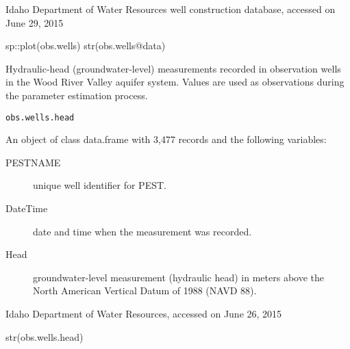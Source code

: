 \documentclass[a4paper]{book}
\begin{document}
%
\begin{Source}\relax
Idaho Department of Water Resources well construction database,
accessed on June 29, 2015
\end{Source}
%
\begin{SeeAlso}\relax
{}
\end{SeeAlso}
%
\begin{Examples}
\begin{ExampleCode}
sp::plot(obs.wells)
str(obs.wells@data)

\end{ExampleCode}
\end{Examples}
%
\begin{Description}\relax
Hydraulic-head (groundwater-level) measurements recorded in observation wells in the
Wood River Valley aquifer system.
Values are used as observations during the parameter estimation process.
\end{Description}
%
\begin{Usage}
\begin{verbatim}
obs.wells.head
\end{verbatim}
\end{Usage}
%
\begin{Format}
An object of class data.frame with 3,477 records and the following variables:
\begin{description}

\item[PESTNAME] unique well identifier for PEST.
\item[DateTime] date and time when the measurement was recorded.
\item[Head] groundwater-level measurement (hydraulic head)
in meters above the North American Vertical Datum of 1988 (NAVD 88).

\end{description}
\end{Format}
%
\begin{Source}\relax
Idaho Department of Water Resources, accessed on June 26, 2015
\end{Source}
%
\begin{SeeAlso}\relax
{}
\end{SeeAlso}
%
\begin{Examples}
\begin{ExampleCode}
str(obs.wells.head)

\end{ExampleCode}
\end{Examples}
\end{document}
